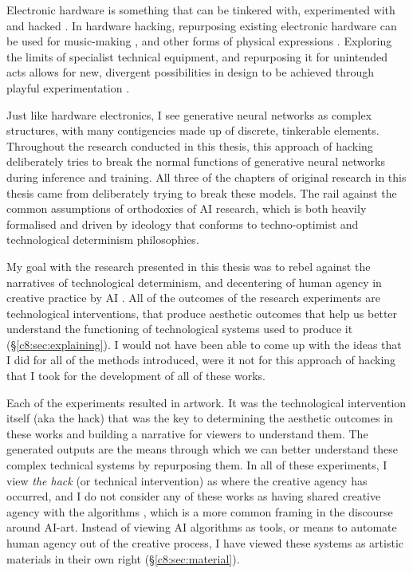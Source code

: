 Electronic hardware is something that can be tinkered with, experimented with and hacked \citep{collins2004hardware, grand2004hardware}. 
In hardware hacking, repurposing existing electronic hardware can be used for music-making \citep{collins2009handmade}, and other forms of physical expressions \citep{hartmann2008hacking}.
Exploring the limits of specialist technical equipment, and repurposing it for unintended acts allows for new, divergent possibilities in design to be achieved through playful experimentation \citep{goddard2015playful}.

Just like hardware electronics, I see generative neural networks as complex structures, with many contigencies made up of discrete, tinkerable elements.
Throughout the research conducted in this thesis, this approach of hacking deliberately tries to break the normal functions of generative neural networks during inference and training. 
All three of the chapters of original research in this thesis came from deliberately trying to break these models.
The rail against the common assumptions of orthodoxies of AI research, which is both heavily formalised and driven by ideology \citep{sias2021ideology} that conforms to techno-optimist \citep{andreesen2023techno} and technological determinism \citep{drew2016technological} philosophies. 

My goal with the research presented in this thesis was to rebel against the narratives of technological determinism, and decentering of human agency in creative practice by AI \citep{zeilinger2021tactical}.
All of the outcomes of the research experiments are technological interventions, that produce aesthetic outcomes that help us better understand the functioning of technological systems used to produce it (\S \ref{c8:sec:explaining}). 
I would not have been able to come up with the ideas that I did for all of the methods introduced, were it not for this approach of hacking that I took for the development of all of these works.

Each of the experiments resulted in artwork.
It was the technological intervention itself (aka the hack) that was the key to determining the aesthetic outcomes in these works and building a narrative for viewers to understand them.
The generated outputs are the means through which we can better understand these complex technical systems by repurposing them.
In all of these experiments, I view \textit{the hack} (or technical intervention) as where the creative agency has occurred, and I do not consider any of these works as having shared creative agency with the algorithms \citep{moruzzi2022creative}, which is a more common framing in the discourse around AI-art.
Instead of viewing AI algorithms as tools, or means to automate human agency out of the creative process, I have viewed these systems as artistic materials in their own right (\S \ref{c8:sec:material}).

